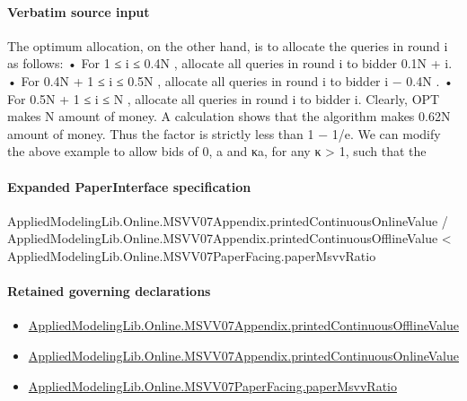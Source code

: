 \documentclass[10pt]{article}
\begin{document}
\paragraph{Verbatim source input}
\begin{ReviewVerbatim}
The optimum allocation, on the other hand, is to allocate the queries in round i as follows:
• For 1 ≤ i ≤ 0.4N , allocate all queries in round i to bidder 0.1N + i.
• For 0.4N + 1 ≤ i ≤ 0.5N , allocate all queries in round i to bidder i − 0.4N .
• For 0.5N + 1 ≤ i ≤ N , allocate all queries in round i to bidder i.
Clearly, OPT makes N amount of money. A calculation shows that the algorithm makes 0.62N
amount of money. Thus the factor is strictly less than 1 − 1/e.
We can modify the above example to allow bids of 0, a and κa, for any κ > 1, such that the
\end{ReviewVerbatim}



\paragraph{Expanded PaperInterface specification}
\begin{ReviewVerbatim}
AppliedModelingLib.Online.MSVV07Appendix.printedContinuousOnlineValue /
    AppliedModelingLib.Online.MSVV07Appendix.printedContinuousOfflineValue <
  AppliedModelingLib.Online.MSVV07PaperFacing.paperMsvvRatio
\end{ReviewVerbatim}

\paragraph{Retained governing declarations}
\begin{itemize}\raggedright
\item \hyperlink{governing-declaration-e5424fafce38493a}{Applied\allowbreak{}Modeling\allowbreak{}Lib.\allowbreak{}Online.\allowbreak{}MSVV07\allowbreak{}Appendix.\allowbreak{}printed\allowbreak{}Continuous\allowbreak{}Offline\allowbreak{}Value}
\item \hyperlink{governing-declaration-59635b003cd74cb6}{Applied\allowbreak{}Modeling\allowbreak{}Lib.\allowbreak{}Online.\allowbreak{}MSVV07\allowbreak{}Appendix.\allowbreak{}printed\allowbreak{}Continuous\allowbreak{}Online\allowbreak{}Value}
\item \hyperlink{governing-declaration-11865634591d1a39}{Applied\allowbreak{}Modeling\allowbreak{}Lib.\allowbreak{}Online.\allowbreak{}MSVV07\allowbreak{}Paper\allowbreak{}Facing.\allowbreak{}paper\allowbreak{}Msvv\allowbreak{}Ratio}
\end{itemize}
\end{document}
